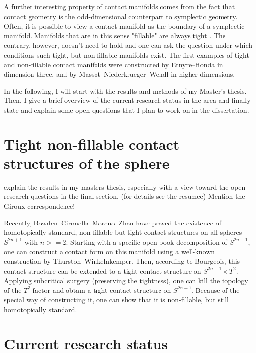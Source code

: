 \documentclass{amsart}
\begin{document}
A further interesting property of contact manifolds comes from the fact that contact geometry is the odd-dimensional counterpart to symplectic geometry. Often, it is possible to view a contact manifold as the boundary of a symplectic manifold. Manifolds that are in this sense "fillable" are always tight \cite{Gromov85,Eliashberg91}. The contrary, however, doesn't need to hold and one can ask the question under which conditions such tight, but non-fillable manifolds exist. The first examples of tight and non-fillable contact manifolds were constructed by Etnyre--Honda \cite{EH02} in dimension three, and by Massot--Niederkrueger--Wendl \cite{MNW13} in higher dimensions.

In the following, I will start with the results and methods of my Master's thesis.
Then, I give a brief overview of the current research status in the area and
finally state and explain some open questions that I plan to work on in the dissertation.

\section*{Tight non-fillable contact structures of the sphere}
explain the results in my masters thesis, especially with a view toward the open research questions in the final section. (for details see the resumee)
Mention the Giroux correspondence!

Recently, Bowden--Gironella--Moreno--Zhou \cite{BGMZ22} have proved the existence of homotopically standard, non-fillable but tight contact structures on all spheres $S^{2n+1}$ with $n >= 2$. Starting with a specific open book decomposition of $S^{2n-1}$, one can construct a contact form on this manifold using a well-known construction by Thurston--Winkelnkemper. Then, according to Bourgeois, this contact structure can be extended to a tight contact structure on $S^{2n-1}\times T^2$.
Applying subcritical surgery (preserving the tightness), one can kill the topology of the $T^2$-factor and obtain a tight contact structure on $S^{2n+1}$. Because of the special way of constructing it, one can show that it is non-fillable, but still homotopically standard.
\section*{Current research status}
\end{document}

